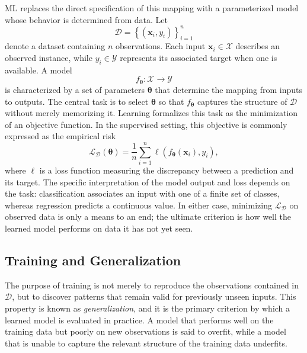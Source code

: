 \gls{ML} replaces the direct specification of this mapping with a
parameterized model whose behavior is determined from data.
%
Let
%
\begin{equation}
    \mathcal{D}
    =
    \left\{
        \left(\mathbf{x}_i, y_i\right)
    \right\}_{i=1}^{n}
\end{equation}
%
denote a dataset containing $n$ observations.
%
Each input $\mathbf{x}_i \in \mathcal{X}$ describes an observed instance, while
$y_i \in \mathcal{Y}$ represents its associated target when one is available.
%
A model
%
\begin{equation}
    f_{\boldsymbol{\theta}} \colon \mathcal{X} \rightarrow \mathcal{Y}
\end{equation}
%
is characterized by a set of parameters $\boldsymbol{\theta}$ that determine
the mapping from inputs to outputs.
%
The central task is to select $\boldsymbol{\theta}$ so that $f_{\boldsymbol{\theta}}$
 captures the structure of $\mathcal{D}$ without merely memorizing it.
%
Learning formalizes this task as the minimization of an objective function.
%
In the supervised setting, this objective is commonly expressed as the empirical
risk
%
\begin{equation}
    \mathcal{L}_{\mathcal{D}}(\boldsymbol{\theta})
    =
    \frac{1}{n}
    \sum_{i=1}^{n}
    \ell
    \left(
        f_{\boldsymbol{\theta}}(\mathbf{x}_i),
        y_i
    \right),
    \label{eq:empirical-risk}
\end{equation}
%
where $\ell$ is a loss function measuring the discrepancy between a prediction
and its target.
%
The specific interpretation of the model output and loss depends on the task:
 classification associates an input with one of a finite set of classes,
 whereas regression predicts a continuous value.
%
In either case, minimizing $\mathcal{L}_{\mathcal{D}}$ on observed data is only a means to an end;
 the ultimate criterion is how well the learned model performs on data it has not yet seen.


\subsection{Training and Generalization}
\label{subsec:training-generalization}

The purpose of training is not merely to reproduce the observations contained
in $\mathcal{D}$, but to discover patterns that remain valid for previously unseen inputs.
%
This property is known as \emph{generalization}, and it is the primary criterion
 by which a learned model is evaluated in practice.
%
A model that performs well on the training data but poorly on new observations
is said to overfit, while a model that is unable to capture the relevant structure
of the training data underfits.

